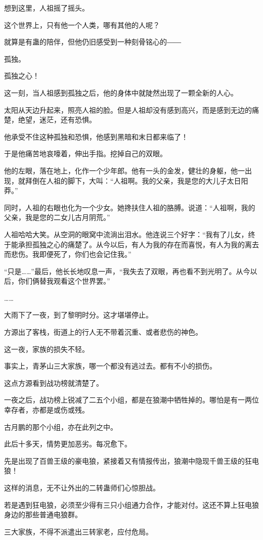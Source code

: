 \begin{this_body}
想到这里，人祖摇了摇头。

这个世界上，只有他一个人类，哪有其他的人呢？

就算是有蛊的陪伴，但他仍旧感受到一种刻骨铭心的――

孤独。

孤独之心！

这一刻，当人祖感到孤独之后，他的身体中就陡然出现了一颗全新的人心。

太阳从天边升起来，照亮人祖的脸。但是人祖却没有感到高兴，而是感到无边的痛楚，绝望，迷茫，还有恐惧。

他承受不住这种孤独和恐惧，他感到黑暗和末日都来临了！

于是他痛苦地哀嚎着，伸出手指。挖掉自己的双眼。

他的左眼，落在地上，化作一个少年郎。他有一头的金发，健壮的身躯，他一出现，就拜倒在人祖的脚下，大叫：“人祖啊。我的父亲，我是您的大儿子太日阳莽。”

同时，人祖的右眼也化为一个少女。她搀扶住人祖的胳膊。说道：“人祖啊，我的父亲，我是您的二女儿古月阴荒。”

人祖哈哈大笑。从空洞的眼窝中流淌出泪水。他连说三个好字：“我有了儿女，终于能承担孤独之心的痛楚了。从今以后，有人为我的存在而喜悦，有人为我的离去而悲伤。我即便死了，你们也会记住我。”

“只是……”最后，他长长地叹息一声，“我失去了双眼，再也看不到光明了。从今以后，你们俩替我观看这个世界罢。”

……

大雨下了一夜，到了黎明时分。这才堪堪停止。

方源出了客栈，街道上的行人无不带着沉重、或者悲伤的神色。

这一夜，家族的损失不轻。

事实上，青茅山三大家族，哪一个都没有逃过去。都有不小的损伤。

这点方源看到战功榜就清楚了。

一夜之后，战功榜上锐减了二五个小组，都是在狼潮中牺牲掉的。哪怕是有一两位幸存者，亦都是或伤或残。

古月鹏的那个小组，亦在此列之中。

此后十多天，情势更加恶劣。每况愈下。

先是出现了百兽王级的豪电狼，紧接着又有情报传出，狼潮中隐现千兽王级的狂电狼！

这样的消息，无不让外出的二转蛊师们心惊胆战。

若是遇到狂电狼，必须至少得有三只小组通力合作，才能对付。这还不算上狂电狼身边的那些普通电狼群。

三大家族，不得不派遣出三转家老，应付危局。


\end{this_body}
